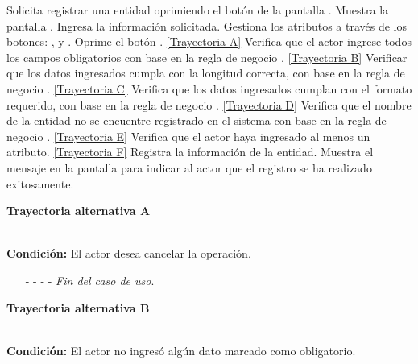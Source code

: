 	\begin{UCtrayectoria}
		\UCpaso[\UCactor] Solicita registrar una entidad oprimiendo el botón  de la pantalla .
		\UCpaso[\UCsist] Muestra la pantalla . \label{CU7.1-P2}
		\UCpaso[\UCactor] Ingresa la información solicitada. \label{CU7.1-P3}
		\UCpaso[\UCactor] Gestiona los atributos a través de los botones: , \editar y \eliminar. \label{CU7.1-P4}
		\UCpaso[\UCactor] Oprime el botón . \hyperlink{CU7-1:TAA}{[Trayectoria A]}
		\UCpaso[\UCsist] Verifica que el actor ingrese todos los campos obligatorios con base en la regla de negocio . \hyperlink{CU7-1:TAB}{[Trayectoria B]}
		\UCpaso[\UCsist] Verificar que los datos ingresados cumpla con la longitud correcta, con base en la regla de negocio . \hyperlink{CU7-1:TAC}{[Trayectoria C]}
		\UCpaso[\UCsist] Verifica que los datos ingresados cumplan con el formato requerido, con base en la regla de negocio . \hyperlink{CU7-1:TAD}{[Trayectoria D]}
		\UCpaso[\UCsist] Verifica que el nombre de la entidad no se encuentre registrado en el sistema con base en la regla de negocio . \hyperlink{CU7-1:TAE}{[Trayectoria E]}
		\UCpaso[\UCsist] Verifica que el actor haya ingresado al menos un atributo. \hyperlink{CU7-1:TAF}{[Trayectoria F]}
		\UCpaso[\UCsist] Registra la información de la entidad.
		\UCpaso[\UCsist] Muestra el mensaje  en la pantalla  para indicar al actor que el registro se ha realizado exitosamente.
	\end{UCtrayectoria}		
\hypertarget{CU7-1:TAA}{\textbf{Trayectoria alternativa A}}\\
\noindent \textbf{Condición:} El actor desea cancelar la operación.
\begin{enumerate}
	\UCpaso[\UCactor] Solicita cancelar la operación oprimiendo el botón  de la pantalla 
	\UCpaso[\UCsist] Muestra la pantalla .
	\item[- -] - - {\em {Fin del caso de uso}}.%
\end{enumerate}
\hypertarget{CU7-1:TAB}{\textbf{Trayectoria alternativa B}}\\
\noindent \textbf{Condición:} El actor no ingresó algún dato marcado como obligatorio.
